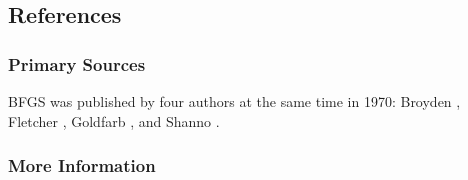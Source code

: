 
\subsection{References}

\subsubsection{Primary Sources}
BFGS was published by four authors at the same time in 1970: Broyden \cite{Broyden1970}, Fletcher \cite{Fletcher1970}, Goldfarb \cite{Goldfarb1970}, and Shanno \cite{Shanno1970}.

\subsubsection{More Information}





